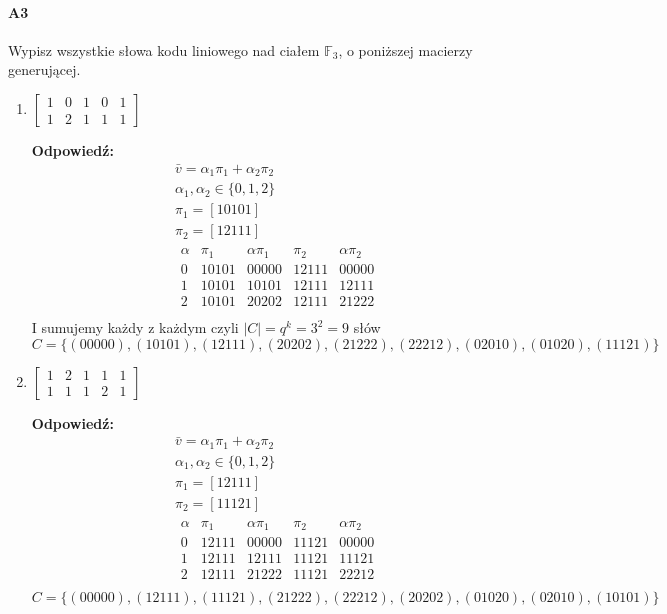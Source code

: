 \paragraph{A3} Wypisz wszystkie słowa kodu liniowego nad ciałem $\mathbb{F}_3$, o poniższej macierzy generującej.
\begin{enumerate}[label=\alph*)]
\item $\begin{bmatrix}
1& 0& 1& 0& 1\\
1& 2& 1& 1& 1
\end{bmatrix}$

\textbf{Odpowiedź:}
\begin{align*}
&\bar{v}=\alpha_1\pi_1+ \alpha _2\pi_2\\
&\alpha _1,\alpha_2\in\{0,1,2\}\\
&\pi_1=[10101]\\
&\pi_2=[12111]\\
&\begin{array}{l|l|l||l|l}
\alpha & \pi_1 & \alpha\pi_1 &\pi _2 &\alpha\pi_2\\\hline
0 & 10101 & 00000 & 12111 & 00000 \\
1 & 10101 & 10101 & 12111 & 12111 \\
2 & 10101 & 20202 & 12111 & 21222 \\
\end{array}
\end{align*}
I sumujemy każdy z każdym czyli $|C|=q^k=3^2=9$ słów
$$C=\{(00000),(10101),(12111),(20202),(21222),(22212),(02010),(01020),(11121)\}$$
\item $\begin{bmatrix}
1& 2& 1& 1& 1\\
1& 1& 1& 2& 1 \end{bmatrix}$

\textbf{Odpowiedź:}
\begin{align*}
&\bar{v}=\alpha_1\pi_1+ \alpha _2\pi_2\\
&\alpha _1,\alpha_2\in\{0,1,2\}\\
&\pi_1=[12111]\\
&\pi_2=[11121]\\
&\begin{array}{l|l|l||l|l}
\alpha & \pi_1 & \alpha\pi_1 &\pi _2 &\alpha\pi_2\\\hline
0 & 12111 & 00000 & 11121 & 00000 \\
1 & 12111 & 12111 & 11121 & 11121 \\
2 & 12111 & 21222 & 11121 & 22212 \\
\end{array}
\end{align*}
$$C=\{(00000),(12111),(11121),(21222),(22212),(20202),(01020),(02010),(10101)\}$$
\end{enumerate}


